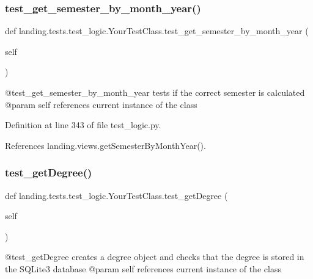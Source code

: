\subsubsection{\texorpdfstring{test\+\_\+get\+\_\+semester\+\_\+by\+\_\+month\+\_\+year()}{test\_get\_semester\_by\_month\_year()}}
{\footnotesize\ttfamily def landing.\+tests.\+test\+\_\+logic.\+Your\+Test\+Class.\+test\+\_\+get\+\_\+semester\+\_\+by\+\_\+month\+\_\+year (\begin{DoxyParamCaption}\item[{}]{self }\end{DoxyParamCaption})}

\begin{DoxyVerb}@test_get_semester_by_month_year tests if the correct semester is calculated
@param self references current instance of the class
\end{DoxyVerb}
 

Definition at line 343 of file test\+\_\+logic.\+py.



References landing.\+views.\+get\+Semester\+By\+Month\+Year().

\mbox{\label{classlanding_1_1tests_1_1test__logic_1_1YourTestClass_a9e136af10d0f563ebb4a3a1b1075a6ed}} 
\subsubsection{\texorpdfstring{test\+\_\+get\+Degree()}{test\_getDegree()}}
{\footnotesize\ttfamily def landing.\+tests.\+test\+\_\+logic.\+Your\+Test\+Class.\+test\+\_\+get\+Degree (\begin{DoxyParamCaption}\item[{}]{self }\end{DoxyParamCaption})}

\begin{DoxyVerb}@test_getDegree creates a degree object and checks that the degree is stored in the SQLite3 database
@param self references current instance of the class
\end{DoxyVerb}
 

